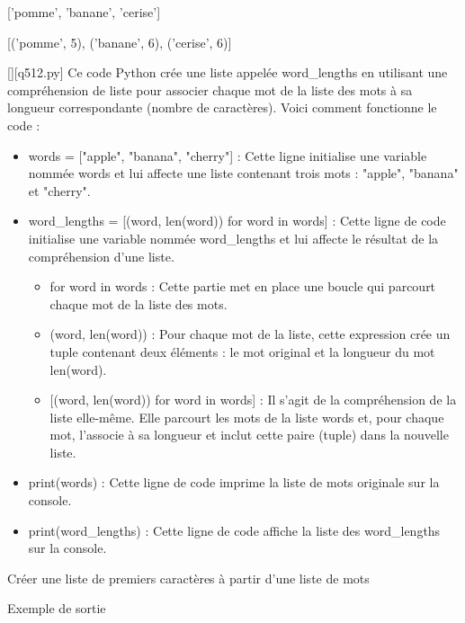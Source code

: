 ['pomme', 'banane', 'cerise']

[('pomme', 5), ('banane', 6), ('cerise', 6)]
        \par
        \begin{solution}
            \renewcommand{\nomfichier}{q512.py}
            \pythonfile{\chemincode \nomfichier}[][\nomfichier]
            Ce code Python crée une liste appelée word\_lengths en utilisant une compréhension de liste pour associer chaque mot de la liste des mots à sa longueur correspondante (nombre de caractères). Voici comment fonctionne le code :

 \begin{itemize}
 	\item    words = ["apple", "banana", "cherry"] : Cette ligne initialise une variable nommée words et lui affecte une liste contenant trois mots : "apple", "banana" et "cherry".
 	\item     word\_lengths = [(word, len(word)) for word in words] : Cette ligne de code initialise une variable nommée word\_lengths et lui affecte le résultat de la compréhension d'une liste.
 
    \begin{itemize}
    	\item     for word in words : Cette partie met en place une boucle qui parcourt chaque mot de la liste des mots.
    	\item         (word, len(word)) : Pour chaque mot de la liste, cette expression crée un tuple contenant deux éléments : le mot original et la longueur du mot len(word).
    	\item{}         [(word, len(word)) for word in words] : Il s'agit de la compréhension de la liste elle-même. Elle parcourt les mots de la liste words et, pour chaque mot, l'associe à sa longueur et inclut cette paire (tuple) dans la nouvelle liste.
    \end{itemize}
    \item print(words) : Cette ligne de code imprime la liste de mots originale sur la console.
    \item print(word\_lengths) : Cette ligne de code affiche la liste des word\_lengths sur la console.
    \end{itemize}
        \end{solution}
        

        \question
        Créer une liste de premiers caractères à partir d'une liste de mots

Exemple de sortie

